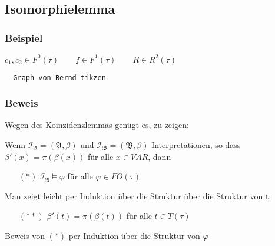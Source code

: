 \subsection{Isomorphielemma}

\subsubsection{Beispiel}

$c_1, c_2  \in F^0(\tau) \qquad f \in F^1(\tau) \qquad R \in R^2(\tau)$

\begin{verbatim}
  Graph von Bernd tikzen
\end{verbatim}

\subsubsection{Beweis}

Wegen des Koinzidenzlemmas genügt es, zu zeigen:

Wenn $\mathcal{I}_\mathfrak{A} = (\mathfrak{A},\beta)$ und $\mathcal{I}_\mathfrak{B} = (\mathfrak{B}, \beta)$ Interpretationen,
so dass $\beta'(x) = \pi(\beta(x))$ für alle $x\in VAR$, dann

\begin{itemize}
  \item[$(*)$] $\mathcal{I}_\mathfrak{A} \models \varphi$ für alle $\varphi \in FO(\tau)$
\end{itemize}

Man zeigt leicht per Induktion über die Struktur über die Struktur von t:

\begin{itemize}
  \item[$(**)$] $\beta'(t) = \pi(\beta(t))$ für alle $t \in T(\tau)$
\end{itemize}

Beweis von $(*)$ per Induktion über die Struktur von $\varphi$


